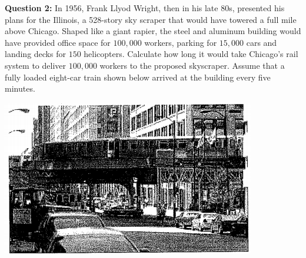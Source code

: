 \documentclass{article}
\begin{document}
\newpage
\textbf{Question 2:} In 1956, Frank Llyod Wright, then in his late 80s, presented his plans for the Illinois, a 528-story sky scraper that would have towered a full mile above Chicago. Shaped like a giant rapier, the steel and aluminum building would have provided office space for $100,000$ workers, parking for $15,000$ cars and landing decks for $150$ helicopters. Calculate how long it would take Chicago's rail system to deliver $100,000$ workers to the proposed skyscraper. Assume that a fully loaded eight-car train shown below arrived at the building every five minutes.
\begin{center}
    \includegraphics[width=0.8\linewidth]{2009-1-2.png}
\end{center}

\newpage
\end{document}

